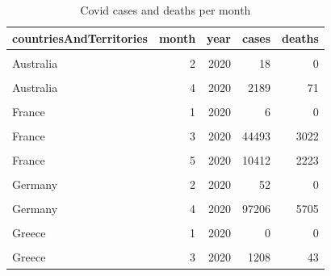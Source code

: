 \documentclass[11pt,a4paper,]{article}
\begin{document}
\clearpage

\begin{table}[!h]

\caption{\label{tab:covidtab}Covid cases and deaths per month}
\centering
\begin{tabular}[t]{lrrrr}
\toprule
countriesAndTerritories & month & year & cases & deaths\\
\midrule
\cellcolor{gray!6}{Australia} & \cellcolor{gray!6}{1} & \cellcolor{gray!6}{2020} & \cellcolor{gray!6}{7} & \cellcolor{gray!6}{0}\\
Australia & 2 & 2020 & 18 & 0\\
\cellcolor{gray!6}{Australia} & \cellcolor{gray!6}{3} & \cellcolor{gray!6}{2020} & \cellcolor{gray!6}{4532} & \cellcolor{gray!6}{19}\\
Australia & 4 & 2020 & 2189 & 71\\
\cellcolor{gray!6}{Australia} & \cellcolor{gray!6}{5} & \cellcolor{gray!6}{2020} & \cellcolor{gray!6}{183} & \cellcolor{gray!6}{7}\\
\addlinespace
France & 1 & 2020 & 6 & 0\\
\cellcolor{gray!6}{France} & \cellcolor{gray!6}{2} & \cellcolor{gray!6}{2020} & \cellcolor{gray!6}{51} & \cellcolor{gray!6}{2}\\
France & 3 & 2020 & 44493 & 3022\\
\cellcolor{gray!6}{France} & \cellcolor{gray!6}{4} & \cellcolor{gray!6}{2020} & \cellcolor{gray!6}{83892} & \cellcolor{gray!6}{21063}\\
France & 5 & 2020 & 10412 & 2223\\
\addlinespace
\cellcolor{gray!6}{Germany} & \cellcolor{gray!6}{1} & \cellcolor{gray!6}{2020} & \cellcolor{gray!6}{5} & \cellcolor{gray!6}{0}\\
Germany & 2 & 2020 & 52 & 0\\
\cellcolor{gray!6}{Germany} & \cellcolor{gray!6}{3} & \cellcolor{gray!6}{2020} & \cellcolor{gray!6}{61856} & \cellcolor{gray!6}{583}\\
Germany & 4 & 2020 & 97206 & 5705\\
\cellcolor{gray!6}{Germany} & \cellcolor{gray!6}{5} & \cellcolor{gray!6}{2020} & \cellcolor{gray!6}{10099} & \cellcolor{gray!6}{1107}\\
\addlinespace
Greece & 1 & 2020 & 0 & 0\\
\cellcolor{gray!6}{Greece} & \cellcolor{gray!6}{2} & \cellcolor{gray!6}{2020} & \cellcolor{gray!6}{4} & \cellcolor{gray!6}{0}\\
Greece & 3 & 2020 & 1208 & 43\\

\end{tabular}
\end{table}
\end{document}
